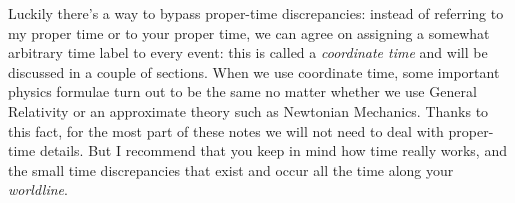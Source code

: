\documentclass[a4paper,12pt,%
onecolumn,oneside,titlepage,%
british%
]{memoir}
\renewcommand*{\|}[1][]{\nonscript\:#1\vert\nonscript\:\mathopen{}}
\begin{document}
Luckily there's a way to bypass proper-time discrepancies: instead of referring to my proper time or to your proper time, we can agree on assigning a somewhat arbitrary time label to every event: this is called a \emph{coordinate time} and will be discussed in a couple of sections.
%
%
When we use coordinate time, some important physics formulae turn out to be the same no matter whether we use General Relativity or an approximate theory such as Newtonian Mechanics. Thanks to this fact, for the most part of these notes we will not need to deal with proper-time details. But I recommend that you keep in mind how time really works, and the small time discrepancies that exist and occur all the time along your \emph{worldline}.
\end{document}
